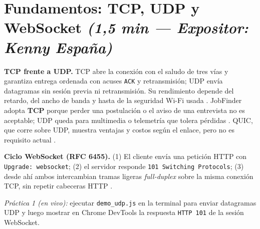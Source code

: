 \documentclass[11pt,a4paper]{article}
\newcommand{\expo}[2]{\hfill{\small\textit{(#1 — Expositor: #2)}}}
\begin{document}
\section*{Fundamentos: TCP, UDP y WebSocket \expo{1,5 min}{Kenny España}}
\textbf{TCP frente a UDP.} TCP abre la conexión con el saludo de tres vías y
garantiza entrega ordenada con acuses \texttt{ACK} y retransmisión; UDP envía
datagramas sin sesión previa ni retransmisión. Su rendimiento depende del retardo,
del ancho de banda y hasta de la seguridad Wi-Fi usada \cite{guo2025tcpudp,ref2}.
JobFinder adopta \textbf{TCP} porque perder una postulación o el aviso de una
entrevista no es aceptable; UDP queda para multimedia o telemetría que tolera
pérdidas \cite{bayilmis2022survey}. QUIC, que corre sobre UDP, muestra ventajas y
costos según el enlace, pero no es requisito actual \cite{jeddou2023tcpquic,kumar2025kquic}.

\textbf{Ciclo WebSocket (RFC 6455).} (1) El cliente envía una petición HTTP con
\texttt{Upgrade: websocket}; (2) el servidor responde \texttt{101 Switching
Protocols}; (3) desde ahí ambos intercambian tramas ligeras \textit{full-duplex}
sobre la misma conexión TCP, sin repetir cabeceras HTTP \cite{ref3,mitrovic2023websocket}.

\textit{Práctica 1 (en vivo):} ejecutar \texttt{demo\_udp.js} en la terminal para
enviar datagramas UDP y luego mostrar en Chrome DevTools la respuesta
\texttt{HTTP 101} de la sesión WebSocket.

\end{document}
